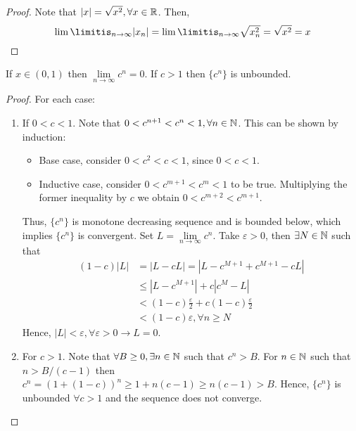 \begin{proof}
    Note that $|x| = \sqrt{x^2}, \forall x \in \mathbb{R}$. Then,
    \begin{equation*}
        \lim \limitis_{n\to \infty} |x_n| = \lim \limitis_{n\to \infty} \sqrt{x_n^2} = \sqrt{x^2} = x
    \end{equation*}
\end{proof}

\begin{theorem}
    If $x \in (0,1)$ then $\lim \limits_{n \to \infty} c^n = 0$. If $c > 1$ then $\{c^n\}$ is unbounded.
\end{theorem}

\begin{proof}
    For each case:
    \begin{enumerate}
        \item If $0 < c < 1$. Note that $0 < c^{n+1} < c^n < 1, \forall n \in \mathbb{N}$. This can be shown by induction:
        \begin{itemize}
            \item Base case, consider $0 < c^2 < c < 1$, since $0 < c < 1$.
            \item Inductive case, consider $0 < c^{m+1} < c^m < 1$ to be true. Multiplying the former inequality by $c$ we obtain $0 < c^{m+2} < c^{m+1}$.
        \end{itemize}
        Thus, $\{c^n\}$ is monotone decreasing sequence and is bounded below, which implies $\{c^n\}$ is convergent. Set $L = \lim \limits_{n \to \infty} c^n$. Take $\varepsilon > 0$, then $\exists N \in \mathbb{N}$ such that
        \begin{equation*}
            \begin{align*}
                (1-c)|L| &= |L-cL| = |L - c^{M+1} + c^{M+1} - cL| \\
                &\leq |L-c^{M+1}| + c|c^M-L| \\
                &< (1-c)\frac{\varepsilon}{2} + c(1-c)\frac{\varepsilon}{2} \\
                &< (1-c) \varepsilon, \forall n \geq N
            \end{align*}
        \end{equation*}
        Hence, $|L| < \varepsilon, \forall \varepsilon>0 \longrightarrow L = 0$.
        \item For $c > 1$. Note that $\forall B \geq 0, \exists n \in \mathbb{N}$ such that $c^n > B$. For $n \in \mathbb{N}$ such that $n > B/(c-1)$ then $c^n = (1+(1-c))^n \geq 1 + n(c-1) \geq n(c-1) > B$. Hence, $\{c^n\}$ is unbounded $\forall c > 1$ and the sequence does not converge.
    \end{enumerate}
\end{proof}

